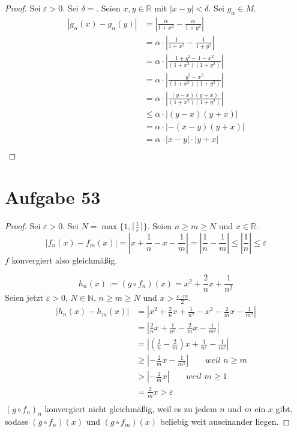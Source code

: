 \documentclass[10pt,a4paper]{article}
\begin{document}
\begin{proof}
Sei $\varepsilon > 0$.
Sei $\delta = $.
Seien $x, y \in \mathbb{R}$ mit $|x - y| < \delta$.
Sei $g_{\alpha} \in M$.
\begin{align*}
|g_{\alpha}(x) - g_{\alpha}(y)| & = |\frac{\alpha}{1 + x^{2}} - \frac{\alpha}{1 + y^{2}}|\\
& = \alpha \cdot |\frac{1}{1 + x^{2}} - \frac{1}{1 + y^{2}}|\\
& = \alpha \cdot |\frac{1 + y^{2} - 1 - x^{2}}{(1 + x^{2})(1 + y^{2})}|\\
& = \alpha \cdot |\frac{y^{2} - x^{2}}{(1 + x^{2})(1 + y^{2})}|\\
& = \alpha \cdot |\frac{(y - x)(y + x)}{(1 + x^{2})(1 + y^{2})}|\\
& \le \alpha \cdot |(y - x)(y + x)|\\
& = \alpha \cdot |-(x - y)(y + x)|\\
& = \alpha \cdot |x - y| \cdot |y + x|\\
\end{align*}
\end{proof}

\section*{Aufgabe 53}

\begin{proof}
Sei $\varepsilon > 0$.
Sei $N = \max \{ 1, \lceil \frac{1}{\varepsilon} \rceil \}$.
Seien $n \ge m \ge N$ und $x \in \mathbb{R}$.
\begin{equation}
|f_{n}(x) - f_{m}(x)| = |x + \frac{1}{n} - x - \frac{1}{m}| = |\frac{1}{n} - \frac{1}{m}| \le |\frac{1}{n}| \le \varepsilon
\end{equation}
$f$ konvergiert also gleichmäßig.

\begin{equation}
h_{n}(x) := (g \circ f_{n})(x) = x^{2} + \frac{2}{n}x + \frac{1}{n^{2}}
\end{equation}
Seien jetzt $\varepsilon > 0$, $N \in \mathbb{N}$, $n \ge m \ge N$ und $x > \frac{\varepsilon \cdot m}{2}$.
\begin{align*}
|h_{n}(x) - h_{m}(x)| & = |x^{2} + \frac{2}{n}x + \frac{1}{n^{2}} - x^{2} - \frac{2}{m}x - \frac{1}{m^{2}}|\\
& = |\frac{2}{n}x + \frac{1}{n^{2}} - \frac{2}{m}x - \frac{1}{m^{2}}|\\
& = |(\frac{2}{n} - \frac{2}{m})x + \frac{1}{n^{2}} - \frac{1}{m^{2}}|\\
& \ge |-\frac{2}{m}x - \frac{1}{m^{2}}| \qquad \textit{weil $n \ge m$}\\
& > |-\frac{2}{m}x| \qquad \textit{weil $m \ge 1$}\\
& = \frac{2}{m}x > \varepsilon\\
\end{align*}
$(g \circ f_{n})_{n}$ konvergiert nicht gleichmäßig, weil es zu jedem $n$ und $m$ ein $x$ gibt, sodass $(g \circ f_{n})(x)$ und $(g \circ f_{m})(x)$ beliebig weit auseinander liegen.
\end{proof}
\end{document}
